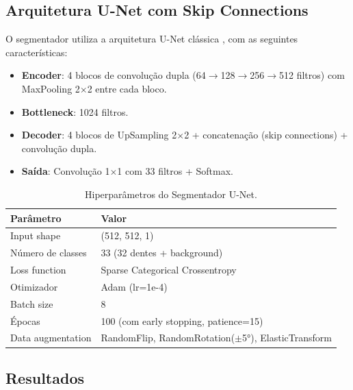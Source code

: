 
\subsection{Arquitetura U-Net com Skip Connections}

O segmentador utiliza a arquitetura U-Net clássica \cite{ronneberger2015u},
com as seguintes características:

\begin{itemize}
  \item \textbf{Encoder}: 4 blocos de convolução dupla (64$\rightarrow$128$\rightarrow$256$\rightarrow$512 filtros)
    com MaxPooling 2$\times$2 entre cada bloco.
  \item \textbf{Bottleneck}: 1024 filtros.
  \item \textbf{Decoder}: 4 blocos de UpSampling 2$\times$2 + concatenação
    (skip connections) + convolução dupla.
  \item \textbf{Saída}: Convolução 1$\times$1 com 33 filtros + Softmax.
\end{itemize}

\begin{table}[H]
  \centering
  \caption{Hiperparâmetros do Segmentador U-Net.}
  \label{tab:unet-hyperparams}
  \begin{tabularx}{\textwidth}{lX}
    \toprule
    \textbf{Parâmetro} & \textbf{Valor} \\
    \midrule
    Input shape & (512, 512, 1) \\
    Número de classes & 33 (32 dentes + background) \\
    Loss function & Sparse Categorical Crossentropy \\
    Otimizador & Adam (lr=1e-4) \\
    Batch size & 8 \\
    Épocas & 100 (com early stopping, patience=15) \\
    Data augmentation & RandomFlip, RandomRotation($\pm$5°), ElasticTransform \\
    \bottomrule
  \end{tabularx}
\end{table}

\subsection{Resultados}

